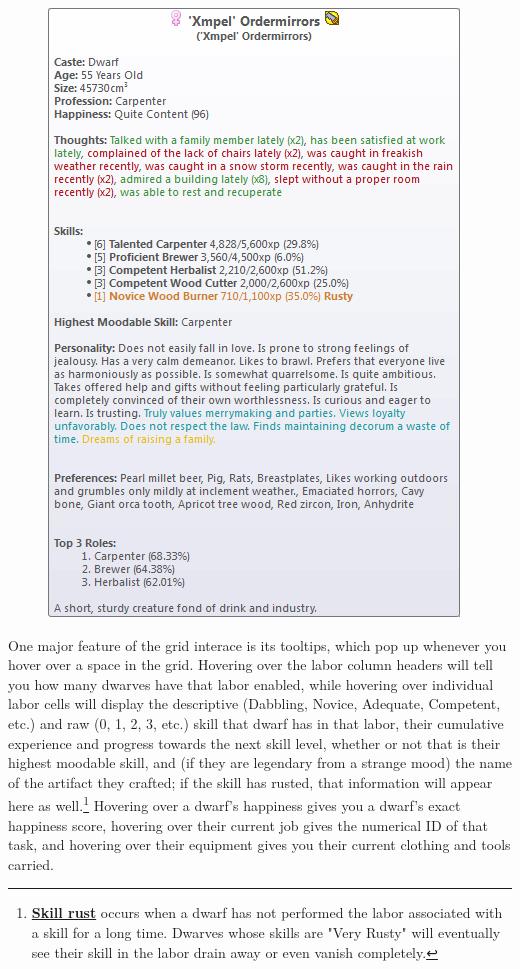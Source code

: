 \documentclass[]{article}
\begin{document}
\begin{figure}
\vspace{-10pt}
  \begin{center}
    \includegraphics[scale=.8]{Sec1Fig8}
  \end{center}
\end{figure}

One major feature of the grid interace is its tooltips, which pop up whenever you hover over a space in
the grid. Hovering over the labor column headers will tell you how many dwarves have that labor enabled,
while hovering over individual labor cells will display the descriptive (Dabbling, Novice, Adequate,
Competent, etc.) and raw (0, 1, 2, 3, etc.) skill that dwarf has in that labor, their cumulative
experience and progress towards the next skill level, whether or not that is their highest moodable
skill, and (if they are legendary from a strange mood) the name of the artifact they crafted; if the
skill has rusted, that information will appear here as well.\footnote{
\href{http://dwarffortresswiki.org/index.php/DF2012:Skill\#Skill_rust}{\textbf{Skill rust}} occurs when
a dwarf has not performed the labor associated with a skill for a long time. Dwarves whose skills are
"Very Rusty" will eventually see their skill in the labor drain away or even vanish completely.}
Hovering over a dwarf's happiness gives you a dwarf's exact happiness score, hovering over their current
job gives the numerical ID of that task, and hovering over their equipment gives you their current
clothing and tools carried.
\end{document}
